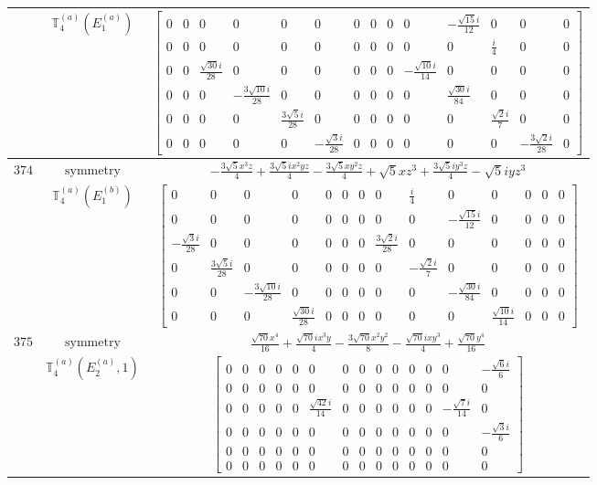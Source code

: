 \documentclass[fleqn,8pt,landscape]{jsarticle}
\begin{document}
\begin{longtable}{ccc}
$  $ & $ \mathbb{T}_{4}^{(a)}(E_{1}^{(a)}) $ & $ \begin{bmatrix} 0 & 0 & 0 & 0 & 0 & 0 & 0 & 0 & 0 & 0 & - \frac{\sqrt{15} i}{12} & 0 & 0 & 0 \\ 0 & 0 & 0 & 0 & 0 & 0 & 0 & 0 & 0 & 0 & 0 & \frac{i}{4} & 0 & 0 \\ 0 & 0 & \frac{\sqrt{30} i}{28} & 0 & 0 & 0 & 0 & 0 & 0 & - \frac{\sqrt{10} i}{14} & 0 & 0 & 0 & 0 \\ 0 & 0 & 0 & - \frac{3 \sqrt{10} i}{28} & 0 & 0 & 0 & 0 & 0 & 0 & \frac{\sqrt{30} i}{84} & 0 & 0 & 0 \\ 0 & 0 & 0 & 0 & \frac{3 \sqrt{5} i}{28} & 0 & 0 & 0 & 0 & 0 & 0 & \frac{\sqrt{2} i}{7} & 0 & 0 \\ 0 & 0 & 0 & 0 & 0 & - \frac{\sqrt{3} i}{28} & 0 & 0 & 0 & 0 & 0 & 0 & - \frac{3 \sqrt{2} i}{28} & 0 \end{bmatrix} $ \\ \hline
$ 374 $ & $ \text{symmetry} $ & $ - \frac{3 \sqrt{5} x^{3} z}{4} + \frac{3 \sqrt{5} i x^{2} y z}{4} - \frac{3 \sqrt{5} x y^{2} z}{4} + \sqrt{5} x z^{3} + \frac{3 \sqrt{5} i y^{3} z}{4} - \sqrt{5} i y z^{3} $ \\
$  $ & $ \mathbb{T}_{4}^{(a)}(E_{1}^{(b)}) $ & $ \begin{bmatrix} 0 & 0 & 0 & 0 & 0 & 0 & 0 & 0 & \frac{i}{4} & 0 & 0 & 0 & 0 & 0 \\ 0 & 0 & 0 & 0 & 0 & 0 & 0 & 0 & 0 & - \frac{\sqrt{15} i}{12} & 0 & 0 & 0 & 0 \\ - \frac{\sqrt{3} i}{28} & 0 & 0 & 0 & 0 & 0 & 0 & \frac{3 \sqrt{2} i}{28} & 0 & 0 & 0 & 0 & 0 & 0 \\ 0 & \frac{3 \sqrt{5} i}{28} & 0 & 0 & 0 & 0 & 0 & 0 & - \frac{\sqrt{2} i}{7} & 0 & 0 & 0 & 0 & 0 \\ 0 & 0 & - \frac{3 \sqrt{10} i}{28} & 0 & 0 & 0 & 0 & 0 & 0 & - \frac{\sqrt{30} i}{84} & 0 & 0 & 0 & 0 \\ 0 & 0 & 0 & \frac{\sqrt{30} i}{28} & 0 & 0 & 0 & 0 & 0 & 0 & \frac{\sqrt{10} i}{14} & 0 & 0 & 0 \end{bmatrix} $ \\ \hline
$ 375 $ & $ \text{symmetry} $ & $ \frac{\sqrt{70} x^{4}}{16} + \frac{\sqrt{70} i x^{3} y}{4} - \frac{3 \sqrt{70} x^{2} y^{2}}{8} - \frac{\sqrt{70} i x y^{3}}{4} + \frac{\sqrt{70} y^{4}}{16} $ \\
$  $ & $ \mathbb{T}_{4}^{(a)}(E_{2}^{(a)},1) $ & $ \begin{bmatrix} 0 & 0 & 0 & 0 & 0 & 0 & 0 & 0 & 0 & 0 & 0 & 0 & 0 & - \frac{\sqrt{6} i}{6} \\ 0 & 0 & 0 & 0 & 0 & 0 & 0 & 0 & 0 & 0 & 0 & 0 & 0 & 0 \\ 0 & 0 & 0 & 0 & 0 & \frac{\sqrt{42} i}{14} & 0 & 0 & 0 & 0 & 0 & 0 & - \frac{\sqrt{7} i}{14} & 0 \\ 0 & 0 & 0 & 0 & 0 & 0 & 0 & 0 & 0 & 0 & 0 & 0 & 0 & - \frac{\sqrt{3} i}{6} \\ 0 & 0 & 0 & 0 & 0 & 0 & 0 & 0 & 0 & 0 & 0 & 0 & 0 & 0 \\ 0 & 0 & 0 & 0 & 0 & 0 & 0 & 0 & 0 & 0 & 0 & 0 & 0 & 0 \end{bmatrix} $ \\ \hline

\end{longtable}
\end{document}
